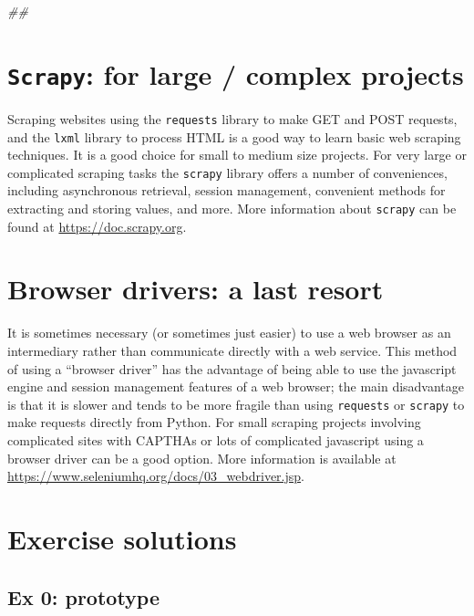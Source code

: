 \documentclass[]{book}
\newenvironment{Shaded}{\begin{snugshade}}{\end{snugshade}}
\newcommand{\CommentTok}[1]{\textcolor[rgb]{0.56,0.35,0.01}{\textit{#1}}}
\begin{document}
\begin{Shaded}
\begin{Highlighting}[]
\CommentTok{##}
\end{Highlighting}
\end{Shaded}

\section{\texorpdfstring{\texttt{Scrapy}: for large / complex
projects}{Scrapy: for large / complex projects}}\label{scrapy-for-large-complex-projects}

Scraping websites using the \texttt{requests} library to make GET and
POST requests, and the \texttt{lxml} library to process HTML is a good
way to learn basic web scraping techniques. It is a good choice for
small to medium size projects. For very large or complicated scraping
tasks the \texttt{scrapy} library offers a number of conveniences,
including asynchronous retrieval, session management, convenient methods
for extracting and storing values, and more. More information about
\texttt{scrapy} can be found at \url{https://doc.scrapy.org}.

\section{Browser drivers: a last
resort}\label{browser-drivers-a-last-resort}

It is sometimes necessary (or sometimes just easier) to use a web
browser as an intermediary rather than communicate directly with a web
service. This method of using a ``browser driver'' has the advantage of
being able to use the javascript engine and session management features
of a web browser; the main disadvantage is that it is slower and tends
to be more fragile than using \texttt{requests} or \texttt{scrapy} to
make requests directly from Python. For small scraping projects
involving complicated sites with CAPTHAs or lots of complicated
javascript using a browser driver can be a good option. More information
is available at \url{https://www.seleniumhq.org/docs/03_webdriver.jsp}.

\section{Exercise solutions}\label{exercise-solutions-5}

\subsection{Ex 0: prototype}\label{ex-0-prototype-5}
\end{document}
